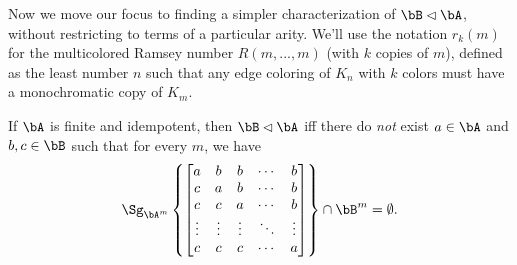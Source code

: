 Now we move our focus to finding a simpler characterization of $\bB \lhd \bA$, without restricting to terms of a particular arity. We'll use the notation $r_k(m)$ for the multicolored Ramsey number $R(m,...,m)$ (with $k$ copies of $m$), defined as the least number $n$ such that any edge coloring of $K_n$ with $k$ colors must have a monochromatic copy of $K_m$.

\begin{thm} If $\bA$ is finite and idempotent, then $\bB \lhd \bA$ iff there do \emph{not} exist $a \in \bA$ and $b,c \in \bB$ such that for every $m$, we have
\[
\Sg_{\bA^m}\left\{\begin{bmatrix} a & b & b & \cdots & b\\ c & a & b & \cdots & b\\ c & c & a & \cdots & b\\ \vdots & \vdots & \vdots & \ddots & \vdots\\ c & c & c & \cdots & a\end{bmatrix}\right\} \cap \bB^m = \emptyset.
\]
\end{thm}
